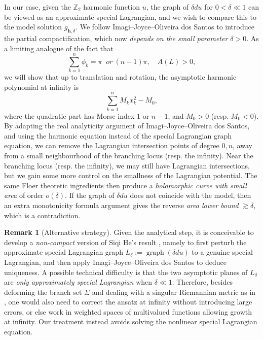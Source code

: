 \documentclass[11pt,a4paper]{article}
\numberwithin{equation}{section}%
\theoremstyle{definition}
\newtheorem{rmk}[thm]{Remark}
\newcommand{\bmh}{\boldsymbol{h}}
\newcommand{\Z}{\mathbb{Z}}
\begin{document}
\begin{itemize}
In our case, given the $\Z_2$ harmonic function $u$, the graph of $\delta du$ for $0<\delta\ll 1$ can be viewed as an approximate special Lagrangian, and we wish to compare this to the model solution $g_{\bmh,\delta}$. We follow Imagi--Joyce--Oliveira dos Santos to introduce the partial compactification, which now \textit{depends on the small parameter $\delta>0$}. As a limiting analogue of the fact that
\[
\sum_{k=1}^n \phi_k= \pi~ \textit{ or}~  (n-1)\pi, \quad A(L)>0, 
\]
we will show that up to translation and rotation, the asymptotic harmonic polynomial at infinity is
\[
\sum_{k=1}^n M_k x_k^2- M_0 ,
\]
where the quadratic part has Morse index $1$ or $n-1$, and $M_0>0$ (resp. $M_0<0$). By adapting the real analyticity argument of Imagi--Joyce--Oliveira dos Santos, and using the harmonic equation instead of the special Lagrangian graph equation, we can remove the Lagrangian intersection points of degree $0,n$, away from a small neighbourhood of the branching locus (resp. the infinity). Near the branching locus (resp. the infinity), we may still have Lagrangian intersections, but we gain some more control on the smallness of the Lagrangian potential. The same Floer theoretic ingredients then produce a \emph{holomorphic curve with small area} of order $o(\delta)$. If the graph of $\delta du$ does not coincide with the model, then an extra monotonicity formula argument gives the reverse \emph{area lower bound}
$\gtrsim \delta$, which is a contradiction.

    

    
    

  
\end{itemize}

\begin{rmk}[Alternative strategy] \label{rmk:alternativestrategy}
  Given the analytical step, it is conceivable to develop a \textit{non-compact} version of Siqi He's result \cite{He-BranchedSLag}, namely to first perturb the approximate special Lagrangian graph $L_\delta:=\operatorname{graph}(\delta du)$ to a genuine special Lagrangian, and then apply Imagi--Joyce--Oliveira dos Santos \cite{IJS} to deduce uniqueness. A possible technical difficulty is that the two asymptotic planes of $L_\delta$ are \textit{only approximately special Lagrangian} when $\delta \ll 1$. Therefore, besides deforming the branch set $\Sigma$ and dealing with a singular Riemannian metric as in \cite{He-BranchedSLag}, one would also need to correct the ansatz at infinity without introducing large errors, or else work in weighted spaces of multivalued functions allowing growth at infinity. Our treatment instead avoids solving the nonlinear special Lagrangian equation.
\end{rmk}
\end{document}
